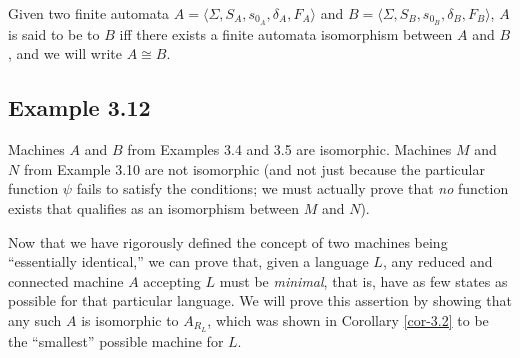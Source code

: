\begin{dfn}\label{dfn-3.6}
Given two finite automata $A=\langle\Sigma,S_A,s_{0_A},\delta_A,F_A\rangle$ and
$B=\langle\Sigma,S_B,s_{0_B},\delta_B,F_B\rangle$, $A$ is said to be
\emph{} to $B$ iff there exists a finite automata isomorphism
between $A$ and $B$, and we will write $A \cong B$.
\end{dfn}

\subsection*{Example 3.12}

Machines $A$ and $B$ from Examples 3.4 and 3.5 are isomorphic. Machines $M$ and
$N$ from Example 3.10 are not isomorphic (and not just because the particular
function $\psi$ fails to satisfy the conditions; we must actually prove that \emph{no}
function exists that qualifies as an isomorphism between $M$ and $N$).

Now that we have rigorously defined the concept of two machines being
``essentially identical,'' we can prove that, given a language $L$, any reduced
and connected machine $A$ accepting $L$ must be \emph{minimal}, that is, have as few
states as possible for that particular language. We will prove this assertion by
showing that any such $A$ is isomorphic to $A_{R_L}$, which was shown in
Corollary \ref{cor-3.2} to be the ``smallest'' possible machine for $L$.


